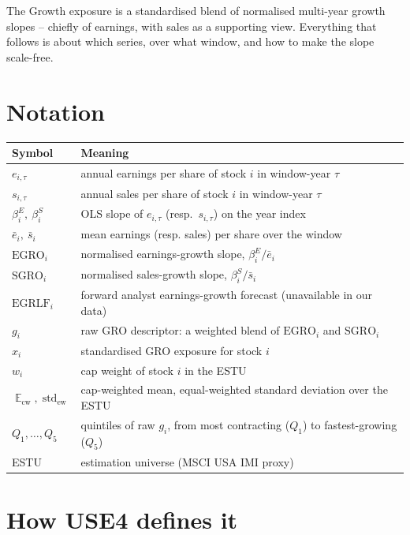 \documentclass[11pt]{article}
\theoremstyle{definition}
\theoremstyle{plain}
\theoremstyle{remark}
\DeclareMathOperator{\std}{std}
\DeclareMathOperator*{\avg}{\mathbb{E}}
\begin{document}
\begin{keyresult}
The Growth exposure is a standardised blend of normalised multi-year growth slopes -- chiefly of earnings, with sales as a supporting view. Everything that follows is about which series, over what window, and how to make the slope scale-free.
\end{keyresult}

\section*{Notation}

\begin{center}
\begin{tabular}{@{}ll@{}}
\toprule
Symbol & Meaning \\
\midrule
$e_{i,\tau}$ & annual earnings per share of stock $i$ in window-year $\tau$ \\
$s_{i,\tau}$ & annual sales per share of stock $i$ in window-year $\tau$ \\
$\beta^{E}_i,\ \beta^{S}_i$ & OLS slope of $e_{i,\tau}$ (resp.\ $s_{i,\tau}$) on the year index \\
$\bar e_i,\ \bar s_i$ & mean earnings (resp. sales) per share over the window \\
$\text{EGRO}_i$ & normalised earnings-growth slope, $\beta^{E}_i / \bar e_i$ \\
$\text{SGRO}_i$ & normalised sales-growth slope, $\beta^{S}_i / \bar s_i$ \\
$\text{EGRLF}_i$ & forward analyst earnings-growth forecast (unavailable in our data) \\
$g_i$ & raw GRO descriptor: a weighted blend of $\text{EGRO}_i$ and $\text{SGRO}_i$ \\
$x_i$ & standardised GRO exposure for stock $i$ \\
$w_i$ & cap weight of stock $i$ in the ESTU \\
$\avg_{\text{cw}}, \std_{\text{ew}}$ & cap-weighted mean, equal-weighted standard deviation over the ESTU \\
$Q_1,\dots,Q_5$ & quintiles of raw $g_i$, from most contracting ($Q_1$) to fastest-growing ($Q_5$) \\
ESTU & estimation universe (MSCI USA IMI proxy) \\
\bottomrule
\end{tabular}
\end{center}

\section{How USE4 defines it}\label{sec:def}
\end{document}
